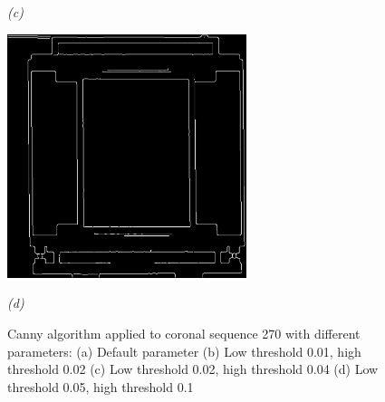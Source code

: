 \begin{figure}[htb]
\begin{minipage}[b]{2.75in}
    \centerline{\emph{(c)}}
  \end{minipage}\medskip
  \begin{minipage}[b]{2.75in}
    \centering
    \centerline{\mbox{\includegraphics[width=2.75in]{data_extraction/images/canny/0.05_0.1/20121017_270.eps}}}
    \centerline{\emph{(d)}}
  \end{minipage}
  \caption{Canny algorithm applied to coronal sequence 270 with different parameters: (a) Default parameter (b) Low threshold 0.01, high threshold  0.02 (c) Low threshold 0.02, high threshold  0.04 (d) Low threshold 0.05, high threshold  0.1} \label{fig:canny_ct_270}
\end{figure}

